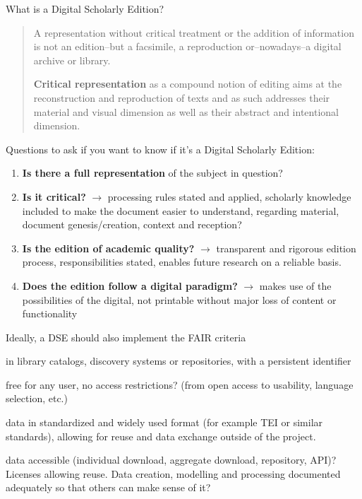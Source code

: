 \begin{frame}[allowframebreaks]{What is a Digital Scholarly Edition?}
\begin{block}{\cite{sahleDigitalEdition2016}}    
    \begin{quote}
        A representation without \lbrack{}critical\rbrack{} treatment or the addition of information is not an edition–but a facsimile, a reproduction or–nowadays–a digital archive or library. 
        
        \textbf{Critical representation} as a compound notion of editing aims at the reconstruction and reproduction of texts and as such addresses their material and visual dimension as well as their abstract and intentional dimension\parencite{sahleDigitalEdition2016}. 
    \end{quote}
\end{block}

\framebreak

Questions to ask if you want to know if it's a Digital Scholarly Edition:
\begin{enumerate}
    \item \textbf{Is there a full representation} of the subject in question?
    \item \textbf{Is it critical?} $\to$ processing rules stated and applied, scholarly knowledge included to make the document easier to understand, regarding material, document genesis/creation, context and reception?
    \item \textbf{Is the edition of academic quality?} $\to$ transparent and rigorous edition process, responsibilities stated, enables future research on a reliable basis.
    \item \textbf{Does the edition follow a digital paradigm?} $\to$ makes use of the possibilities of the digital, not printable without major loss of content or functionality
\end{enumerate}

\framebreak

\begin{alertblock}{Ideally, a DSE should also implement the FAIR criteria}
\begin{description}\footnotesize
    \item[Findable.] in library catalogs, discovery systems or repositories, with a persistent identifier
    \item[Accessible.] free for any user, no access restrictions? (from open access to usability, language selection, etc.) 
    \item[Interoperable.] data in standardized and widely used format (for example TEI or similar standards), allowing for reuse and data exchange outside of the project. 
    \item[Reusable.] data accessible (individual download, aggregate download, repository, API)? Licenses allowing reuse. Data creation, modelling and processing documented adequately so that others can make sense of it? 
\end{description}
\end{alertblock}


\end{frame}
